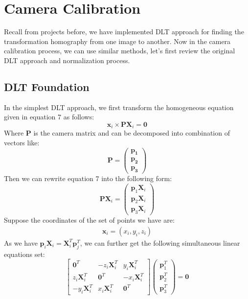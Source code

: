 \documentclass[conference]{IEEEtran}
\newcommand{\mat}[1]{\mathbf{#1}} %
\begin{document}
\section{Camera Calibration}
Recall from projects before, we have implemented DLT approach for finding the transformation homography from one image to another. Now in the camera calibration process, we can use similar methods, let's first review the original DLT approach and normalization process. 
\subsection{DLT Foundation}
In the simplest DLT approach, we first transform the homogeneous equation given in equation 7 as follows:
\begin{equation}
	\mat{x}_i \times \mat{P}\mat{X}_i = \mat{0}
\end{equation}
Where $\mat{P}$ is the camera matrix and can be decomposed into combination of vectors like:
\begin{equation}
	\mat{P} = \begin{pmatrix}
				\mat{p_1}\\
				\mat{p_2}\\
				\mat{p_3}
		       \end{pmatrix}
\end{equation}
Then we can rewrite equation 7 into the following form:
\begin{equation}
	\mat{P}\mat{X}_i =
	\begin{pmatrix}
		\mat{p}_1\mat{X}_i\\
		\mat{p}_2\mat{X}_i\\
		\mat{p}_3\mat{X}_i
	\end{pmatrix}
\end{equation}
Suppose the coordinates of the set of points we have are:
\begin{equation}
	\begin{split}
		\mat{x}_i = (x_i, y_i, z_i)
	\end{split}
\end{equation}
As we have $\mat{p}_i\mat{X}_i = \mat{X}_i^T \mat{p}_j^T$, we can further get the following simultaneous linear equations set:
\begin{equation}
	\begin{bmatrix}
		\mat{0}^T & -z_i\mat{X}_i^T & y_i\mat{X}_i^T\\
		z_i\mat{X}_i^T & \mat{0}^T & -x_i\mat{X}_i^T\\
		-y_i\mat{X}_i^T & x_i\mat{X}_i^T & \mat{0}^T
	\end{bmatrix}
	\begin{pmatrix}
		\mat{p}_1^T\\
		\mat{p}_2^T\\
		\mat{p}_3^T
	\end{pmatrix} = \mat{0}
\end{equation}
\end{document}
